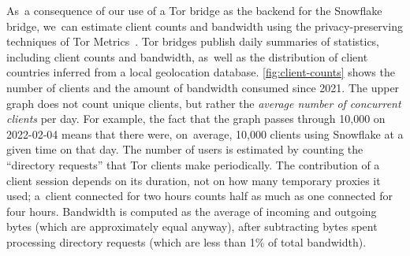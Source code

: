 \documentclass[letterpaper,twocolumn]{article}
\begin{document}
As~a consequence of our use of a Tor bridge
as the backend for the Snowflake bridge,
we~can estimate client counts and bandwidth using
the privacy-preserving
techniques of Tor Metrics~\cite{tor-reproducible-metrics}.
Tor bridges publish daily summaries of statistics,
including client counts and bandwidth,
as~well as the distribution of client countries
inferred from a local geolocation database.
\autoref{fig:client-counts} shows the number of clients
and the amount of bandwidth consumed since 2021.
The upper graph does not count unique clients,
but rather the \emph{average number of concurrent clients} per day.
For example, the fact that the graph passes through 10,000 on \mbox{2022-02-04}
means that there were, on~average, 10,000 clients using Snowflake
at a given time on that day.
The number of users is estimated by counting the ``directory requests''
that Tor clients make periodically.
The contribution of a client session depends on its duration,
not on how many temporary proxies it used;
a~client connected for two hours counts half as much
as one connected for four hours.
Bandwidth is computed as the
average of incoming and outgoing bytes
(which are approximately equal anyway),
after subtracting
bytes spent processing directory requests
(which are less than 1\% of total bandwidth).
\end{document}
